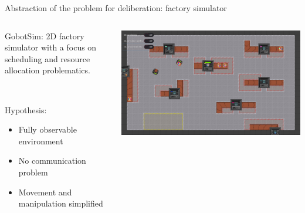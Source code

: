 \begin{frame}{Abstraction of the problem for deliberation: factory simulator}
    \begin{columns}
        \begin{column}{0.6\textwidth}
            GobotSim: 2D factory simulator with a focus on scheduling and resource allocation problematics.

            ~~

            Hypothesis:
            \begin{itemize}
                \item Fully observable environment
                \item No communication problem
                \item Movement and manipulation simplified
            \end{itemize}
        \end{column}
        \begin{column}{0.4\textwidth}
            \includegraphics[width=\linewidth]{images/gobot-rae.png}
        \end{column}
    \end{columns}
\end{frame}

